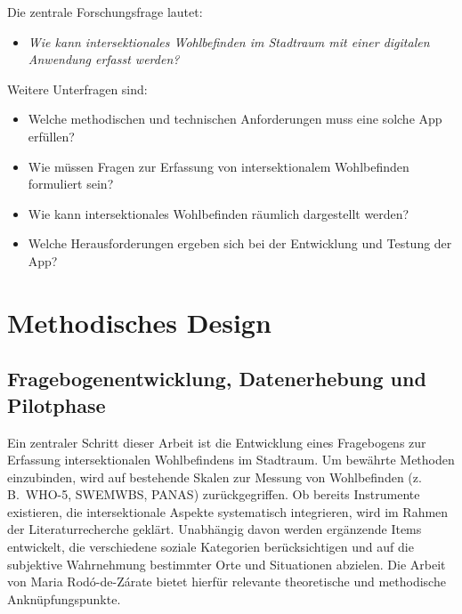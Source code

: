 \documentclass{template}
\begin{document}
Die zentrale Forschungsfrage lautet:
\begin{itemize}
    \item \emph{Wie kann intersektionales Wohlbefinden im Stadtraum mit einer digitalen Anwendung erfasst werden?}
\end{itemize}

Weitere Unterfragen sind:
\begin{itemize}
    \item Welche methodischen und technischen Anforderungen muss eine solche App erfüllen?
    \item Wie müssen Fragen zur Erfassung von intersektionalem Wohlbefinden formuliert sein?
    \item Wie kann intersektionales Wohlbefinden räumlich dargestellt werden?
    \item Welche Herausforderungen ergeben sich bei der Entwicklung und Testung der App?
\end{itemize}

\section{Methodisches Design}

\subsection{Fragebogenentwicklung, Datenerhebung und Pilotphase}

Ein zentraler Schritt dieser Arbeit ist die Entwicklung eines Fragebogens zur Erfassung intersektionalen Wohlbefindens im Stadtraum. Um bewährte Methoden einzubinden, wird auf bestehende Skalen zur Messung von Wohlbefinden (z.\,B.\ WHO-5, SWEMWBS, PANAS) zurückgegriffen. Ob bereits Instrumente existieren, die intersektionale Aspekte systematisch integrieren, wird im Rahmen der Literaturrecherche geklärt. Unabhängig davon werden ergänzende Items entwickelt, die verschiedene soziale Kategorien berücksichtigen und auf die subjektive Wahrnehmung bestimmter Orte und Situationen abzielen. Die Arbeit von Maria Rodó-de-Zárate \parencite*{rodo-de-zarate_intersectionality_2018, rodo-de-zarate_young_2015, rodo-de-zarate_developing_2014}
bietet hierfür relevante theoretische und methodische Anknüpfungspunkte. 
\end{document}
